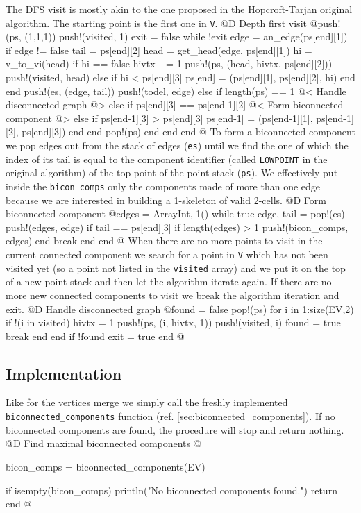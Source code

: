 The DFS visit is mostly akin to the one proposed in the Hopcroft-Tarjan original algorithm.
The starting point is the first one in \texttt{V}.
@D Depth first visit
@{push!(ps, (1,1,1))
push!(visited, 1)
exit = false
while !exit
    edge = an_edge(ps[end][1])
    if edge != false
        tail = ps[end][2]
        head = get_head(edge, ps[end][1])
        hi = v_to_vi(head)
        if hi == false
            hivtx += 1
            push!(ps, (head, hivtx, ps[end][2]))
            push!(visited, head)
        else
            if hi < ps[end][3]
                ps[end] = (ps[end][1], ps[end][2], hi)
            end
        end
        push!(es, (edge, tail))
        push!(todel, edge)
    else
        if length(ps) == 1
            @< Handle disconnected graph @>
        else
            if ps[end][3] == ps[end-1][2]
                @< Form biconnected component @>
            else
                if ps[end-1][3] > ps[end][3]
                    ps[end-1] = (ps[end-1][1], ps[end-1][2], ps[end][3])
                end
            end
            pop!(ps)
        end
    end
end
@}
To form a biconnected component we pop edges out from the stack of edges (\texttt{es}) until we find the one
of which the index of its tail is equal to the component identifier (called \texttt{LOWPOINT} in the original algorithm) 
of the top point of the point stack (\texttt{ps}). We effectively put inside the \texttt{bicon\_comps} only the components
made of more than one edge because we are interested in building a 1-skeleton of valid 2-cells.
@D Form biconnected component
@{edges = Array{Int, 1}()
while true
    edge, tail = pop!(es)
    push!(edges, edge)
    if tail == ps[end][3]
        if length(edges) > 1
            push!(bicon_comps, edges)
        end
        break
    end
end
@}
When there are no more points to visit in the current connected component we search for a point in \texttt{V}
which has not been visited yet (so a point not listed in the \texttt{visited} array) and we put it on the top
of a new point stack and then let the algorithm iterate again. If there are no more new connected components 
to visit we break the algorithm iteration and exit.
@D Handle disconnected graph
@{found = false
pop!(ps)
for i in 1:size(EV,2)
    if !(i in visited)
        hivtx = 1
        push!(ps, (i, hivtx, 1))
        push!(visited, i)
        found = true
        break
    end
end
if !found
    exit = true
end
@}
\subsection{Implementation}
Like for the vertices merge we simply call the freshly implemented \texttt{biconnected\_components} function
(ref. \ref{sec:biconnected_components}). If no biconnected components are found, the procedure will stop and return nothing.
@D Find maximal biconnected components
@{bicon_comps = biconnected_components(EV)

if isempty(bicon_comps)
    println("No biconnected components found.")
    return
end
@}

